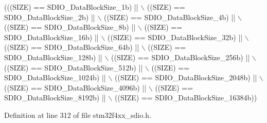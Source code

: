 \begin{DoxyCode}
(((SIZE) == SDIO\_DataBlockSize\_1b) || \(\backslash\)
                                  ((SIZE) == SDIO\_DataBlockSize\_2b) || \(\backslash\)
                                  ((SIZE) == SDIO\_DataBlockSize\_4b) || \(\backslash\)
                                  ((SIZE) == SDIO\_DataBlockSize\_8b) || \(\backslash\)
                                  ((SIZE) == SDIO\_DataBlockSize\_16b) || \(\backslash\)
                                  ((SIZE) == SDIO\_DataBlockSize\_32b) || \(\backslash\)
                                  ((SIZE) == SDIO\_DataBlockSize\_64b) || \(\backslash\)
                                  ((SIZE) == SDIO\_DataBlockSize\_128b) || \(\backslash\)
                                  ((SIZE) == SDIO\_DataBlockSize\_256b) || \(\backslash\)
                                  ((SIZE) == SDIO\_DataBlockSize\_512b) || \(\backslash\)
                                  ((SIZE) == SDIO\_DataBlockSize\_1024b) || \(\backslash\)
                                  ((SIZE) == SDIO\_DataBlockSize\_2048b) || \(\backslash\)
                                  ((SIZE) == SDIO\_DataBlockSize\_4096b) || \(\backslash\)
                                  ((SIZE) == SDIO\_DataBlockSize\_8192b) || \(\backslash\)
                                  ((SIZE) == SDIO\_DataBlockSize\_16384b))
\end{DoxyCode}


Definition at line 312 of file stm32f4xx\-\_\-sdio.\-h.

